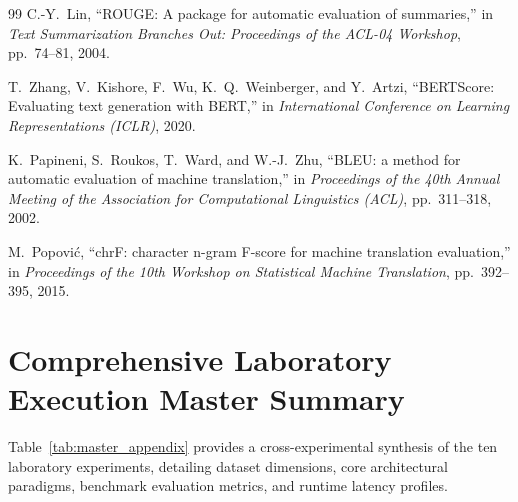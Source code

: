 \begin{thebibliography}{99}
C.-Y.~Lin,
``ROUGE: A package for automatic evaluation of summaries,''
in \emph{Text Summarization Branches Out: Proceedings of the ACL-04 Workshop}, pp.~74--81, 2004.

T.~Zhang, V.~Kishore, F.~Wu, K.~Q.~Weinberger, and Y.~Artzi,
``BERTScore: Evaluating text generation with BERT,''
in \emph{International Conference on Learning Representations (ICLR)}, 2020.

K.~Papineni, S.~Roukos, T.~Ward, and W.-J.~Zhu,
``BLEU: a method for automatic evaluation of machine translation,''
in \emph{Proceedings of the 40th Annual Meeting of the Association for Computational Linguistics (ACL)}, pp.~311--318, 2002.

M.~Popovi\'{c},
``chrF: character n-gram F-score for machine translation evaluation,''
in \emph{Proceedings of the 10th Workshop on Statistical Machine Translation}, pp.~392--395, 2015.

\end{thebibliography}

\appendix
\chapter{Comprehensive Laboratory Execution Master Summary}

Table~\ref{tab:master_appendix} provides a cross-experimental synthesis of the ten laboratory experiments, detailing dataset dimensions, core architectural paradigms, benchmark evaluation metrics, and runtime latency profiles.

